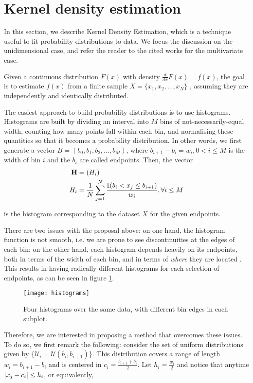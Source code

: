 \documentclass[../main.tex]{subfiles}
\begin{document}
\section{Kernel density estimation} \label{section_kde}
In this section, we describe Kernel Density Estimation, which is a technique useful to fit probability distributions to data. We focus the discussion on the unidimensional case, and refer the reader to the cited works for the multivariate case. 
\par Given a continuous distribution $F(x)$ with density $\frac{d}{dx}F(x) = f(x)$, the goal is to estimate $f(x)$ from a finite sample $X = \{x_1, x_2, ..., x_N\}$ \cite{Hansen2009}, assuming they are independently and identically distributed. 
\par The easiest approach to build probability distributions is to use histograms. Histograms are built by dividing an interval into $M$ bins of not-necessarily-equal width, counting how many points fall within each bin, and normalising these quantities so that it becomes a probability distribution. In other words, we first generate a vector $B = (b_0, b_1, b_2, ..., b_M)$, where $b_{i+1} - b_i = w_i, 0 < i \leq M$ is the width of bin $i$ and the $b_i$ are called endpoints. Then, the vector 
\begin{align*}
\mathbf{H} &= (H_i)\\
H_i &= \frac{1}{N}\sum_{j=1}^{N}\frac{\mathbb{I}( b_{i} < x_j \leq b_{i+1})}{w_i}, \forall i \leq M
\end{align*}
\par is the histogram corresponding to the dataset $X$ for the given endpoints.
\par There are two issues with the proposal above: on one hand, the histogram function is not smooth, i.e. we are prone to see discontinuities at the edges of each bin; on the other hand, each histogram depends heavily on its endpoints, both in terms of the width of each bin, and in terms of \emph{where} they are located \cite{Duong2004}. This results in having radically different histograms for each selection of endpoints, as can be seen in figure \ref{fig_histograms}.
\begin{figure}[t]
\centering
\texttt{[image: histograms]}
\caption{Four histograms over the same data, with different bin edges in each subplot.}
\label{fig_histograms}
\end{figure}
\par Therefore, we are interested in proposing a method that overcomes these issues. To do so, we first remark the following: consider the set of uniform distributions given by $\{\mathcal{U}_i = \mathcal{U}(b_{i}, b_{i+1})\}$. This distribution covers a range of length $w_i = b_{i+1}-b_i$ and is centered in $c_i = \frac{b_{i+1}+b_i}{2}$.  Let $h_i = \frac{w_i}{2}$ and notice that anytime $\lvert x_j - c_i\rvert \leq h_i$, or equivalently,
\end{document}
